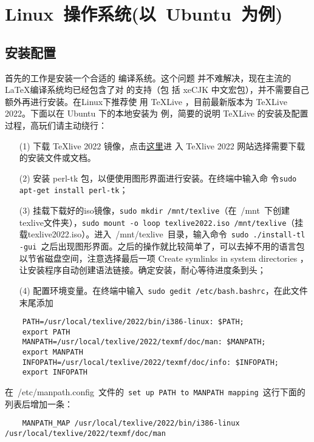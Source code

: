 \section{Linux~操作系统(以~Ubuntu~为例)}

\subsection{安装配置}

首先的工作是安装一个合适的 \XeTeX{}编译系统。这个问题
并不难解决，现在主流的 \LaTeX{}编译系统均已经包含了对 \XeTeX{}的支持（包
括 xeCJK 中文宏包），并不需要自己额外再进行安装。在Linux下推荐使
用 \TeX{}Live ，目前最新版本为 \TeX{}Live 2022。下面以在 Ubuntu 下的本地安装为
例，简要的说明 \TeX{}Live 的安装及配置过程，高玩们请主动绕行：

\begin{enumerate}
  \item[(1)] 下载 \TeX{}live 2022 镜像，点击\href{https://tug.org/texlive/}{这里}进    入 \TeX{}live 2022 网站选择需要下载的安装文件或文档。
  \item[(2)] 安装 perl-tk 包，以便使用图形界面进行安装。在终端中输入命    令\texttt{sudo apt-get install perl-tk}；
  \item[(3)] 挂载下载好的iso镜像，\texttt{sudo mkdir /mnt/texlive}（在~{/mnt}~下创建texlive文件夹），\texttt{sudo mount -o loop texlive2022.iso  /mnt/texlive}（挂载texlive2022.iso）。进入~/mnt/texlive~目录，输入命令~\texttt{sudo ./install-tl -gui}~之后出现图形界面。之后的操作就比较简单了，可以去掉不用的语言包以节省磁盘空间，注意选择最后一项 Create symlinks in system directories ，让安装程序自动创建语法链接。确定安装，耐心等待进度条到头；
  \item[(4)] 配置环境变量。在终端中输入~\texttt{sudo gedit /etc/bash.bashrc}，在此文件末尾添加
\end{enumerate}

\begin{lstlisting}
    PATH=/usr/local/texlive/2022/bin/i386-linux: $PATH;
    export PATH
    MANPATH=/usr/local/texlive/2022/texmf/doc/man: $MANPATH;
    export MANPATH
    INFOPATH=/usr/local/texlive/2022/texmf/doc/info: $INFOPATH;
    export INFOPATH
\end{lstlisting}

在~{/etc/manpath.config}~文件的~\texttt{set up PATH to  MANPATH mapping}~这行下面的列表后增加一条：

\begin{lstlisting}
    MANPATH_MAP /usr/local/texlive/2022/bin/i386-linux  /usr/local/texlive/2022/texmf/doc/man
\end{lstlisting}

